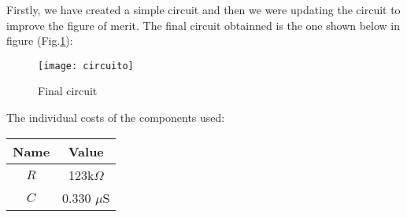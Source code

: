 Firstly, we have created a simple circuit and then we were updating the circuit to improve the figure of merit. The final circuit obtainned is the one shown below in figure (Fig.\ref{fig:circuito}): \par

\begin{figure}[H]
\centering
\texttt{[image: circuito]}
\caption{Final circuit}
\label{fig:circuito}
\end{figure}

The individual costs of the components used: 

\begin{center}
  \begin{tabular}{ | c | c | }
    \hline    
    {\bf Name} & {\bf Value} \\ \hline
    $R$ & 123k$\Omega$ \\ \hline 
    $C$ & 0.330 $\mu$S \\ 
    \hline
  \end{tabular}
\end{center}



